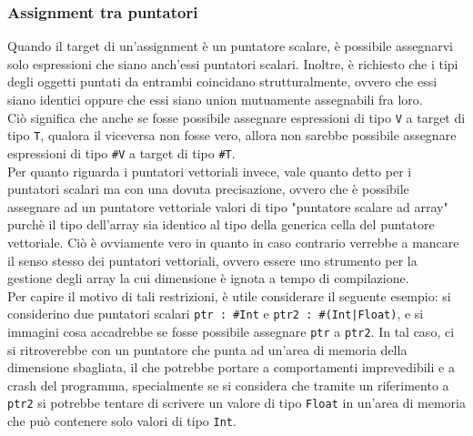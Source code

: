 \subsubsection{Assignment tra puntatori}
Quando il target di un'assignment è un puntatore scalare, è possibile assegnarvi solo 
espressioni che siano anch'essi puntatori scalari. Inoltre, è richiesto che i tipi degli oggetti puntati
da entrambi coincidano strutturalmente, ovvero che essi siano identici 
oppure che essi siano union mutuamente assegnabili fra loro. \\  

Ciò significa che anche se fosse possibile assegnare
espressioni di tipo \texttt{V} a target di tipo \texttt{T}, qualora il viceversa non fosse vero, 
allora non sarebbe possibile assegnare espressioni di tipo \texttt{\#V} a target di tipo \texttt{\#T}. \\

Per quanto riguarda i puntatori vettoriali invece, vale quanto detto per i puntatori scalari 
ma con una dovuta precisazione, ovvero che è possibile assegnare ad un puntatore vettoriale 
valori di tipo "puntatore scalare ad array" purchè il tipo dell'array sia identico al tipo 
della generica cella del puntatore vettoriale. Ciò è ovviamente vero in quanto in caso contrario 
verrebbe a mancare il senso stesso dei puntatori vettoriali, ovvero essere uno strumento per la 
gestione degli array la cui dimensione è ignota a tempo di compilazione. \\

Per capire il motivo di tali restrizioni, è utile considerare il seguente esempio: si considerino
due puntatori scalari \texttt{ptr : \#Int} e \texttt{ptr2 : \#(Int|Float)}, e si immagini cosa 
accadrebbe se fosse possibile assegnare \texttt{ptr} a \texttt{ptr2}. In tal caso, ci si ritroverebbe
con un puntatore che punta ad un'area di memoria della dimensione sbagliata, il che potrebbe portare
a comportamenti imprevedibili e a crash del programma, specialmente se si considera che tramite  un 
riferimento a \texttt{ptr2} si potrebbe tentare di scrivere un valore di tipo \texttt{Float} in un'area
di memoria che può contenere solo valori di tipo \texttt{Int}. \\